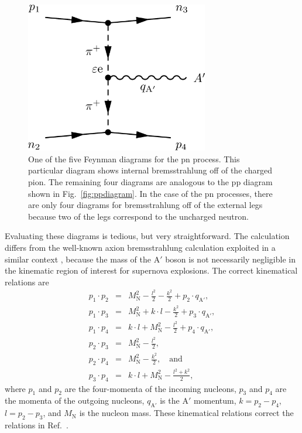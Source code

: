 \documentclass[nofootinbib,prd,superscriptaddress,twocolumn]{revtex4}
\newcommand{\bea}{\begin{eqnarray}}
\newcommand{\eea}{\end{eqnarray}}
\newcommand{\qa}{q_{\mathrm{A}'}}
\newcommand{\Aprime}{\mathrm{A}'}
\begin{document}
\begin{figure}
\includegraphics[width=8cm]{npdiagram.pdf}
\caption{One of the five Feynman diagrams for the pn process. This particular diagram shows 
internal bremsstrahlung off of the charged pion. The remaining four diagrams are analogous to the 
pp diagram shown in Fig.~\ref{fig:ppdiagram}. In the case of the pn processes, there are only four 
diagrams for bremsstrahlung off of the external legs because two of the legs correspond to the 
uncharged neutron.}
\label{fig:npdiagram}
\end{figure}

	
Evaluating these diagrams is tedious, but very straightforward. The calculation differs 
from the well-known axion bremsstrahlung calculation exploited in a similar context \cite{raffelt96_book}, 
because the mass of the $\Aprime$ boson is not necessarily negligible in the kinematic 
region of interest for supernova explosions. The correct kinematical relations are 
%
\bea 
p_1 \cdot p_2 &=& M_{\mathrm N}^2 - \frac{l^2}{2} - \frac{k^2}{2} + p_2 \cdot \qa,\\
p_1 \cdot p_3 &=& M_{\mathrm N}^2 + k \cdot l - \frac{k^2}{2} + p_3 \cdot \qa,\\  
p_1 \cdot p_4 &=& k \cdot l + M_{\mathrm N}^2 - \frac{l^2}{2} + p_4 \cdot \qa, \\
p_2 \cdot p_3 &=& M_{\mathrm N}^2 - \frac{l^2}{2}, \\ 
p_2 \cdot p_4 &=& M_{\mathrm N}^2 - \frac{k^2}{2},\quad \mathrm{and}\\
p_3 \cdot p_4 &=& k \cdot l + M_{\mathrm N}^2 - \frac{l^2 + k^2}{2},
\eea
%
where $p_1$ and $p_2$ are the four-momenta of the incoming nucleons, $p_3$ and $p_4$ are the momenta 
of the outgoing nucleons, $\qa$ is the $\Aprime$ momentum, $k=p_2 - p_4$, $l=p_2 - p_3$, and $M_{\mathrm{N}}$ 
is the nucleon mass. These kinematical relations correct the relations in Ref.~\cite{dent_etal12}.
\end{document}
